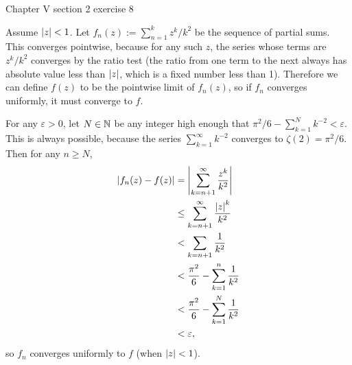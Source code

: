 \documentclass{article}
\begin{document}
\bigskip
\par
\begin{prob}
    Chapter V section 2 exercise 8
\end{prob}
Assume $\left\lvert z \right\rvert<1$. Let $f_n(z) := \sum_{n=1}^k z^k/k^2$ be the sequence of partial sums. This converges pointwise, because for any such $z$, the series whose terms are $z^k/k^2$ converges by the ratio test (the ratio from one term to the next always has absolute value less than $\left\lvert z \right\rvert$, which is a fixed number less than 1). Therefore we can define $f(z)$ to be the pointwise limit of $f_n(z)$, so if $f_n$ converges uniformly, it must converge to $f$.
\par
For any $\varepsilon > 0$, let $N \in \mathbb{N}$ be any integer high enough that $\pi^2/6 - \sum_{k=1}^N k^{-2} < \varepsilon$. This is always possible, because the series $\sum_{k=1}^\infty k^{-2}$ converges to $\zeta(2)=\pi^2/6$. Then for any $n \geq N$,
\begin{align*}
    \left\lvert f_n(z) - f(z) \right\rvert &= \left\lvert  \sum_{k=n+1}^\infty \frac{z^k}{k^2}  \right\rvert \\
                        &\leq \sum_{k=n+1}^\infty \frac{\left\lvert z \right\rvert^k}{k^2} \\
                        &< \sum_{k=n+1} \frac{1}{k^2} \\
                        &< \frac{\pi^2}{6} - \sum_{k=1}^n \frac{1}{k^2} \\
                        &< \frac{\pi^2}{6} - \sum_{k=1}^N \frac{1}{k^2} \\
                        &< \varepsilon,
\end{align*}
so $f_n$ converges uniformly to $f$ (when $\left\lvert z \right\rvert < 1$).


\end{document}
